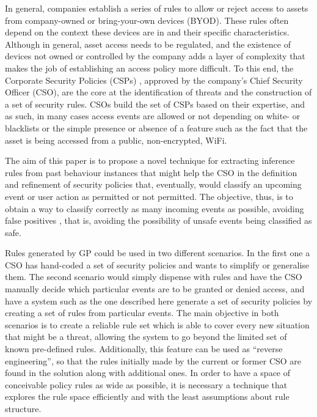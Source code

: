 \documentclass[runningheads]{llncs}
\begin{document}
In general, companies establish a series of rules to allow or reject
access to assets from company-owned or bring-your-own devices (BYOD). These rules often depend on the context these devices are in and their specific
characteristics. Although in general, asset access needs to be
regulated, and the existence of devices not owned or controlled by the company
adds a layer of complexity that makes the job of establishing an
access policy more difficult.
To this end, the Corporate Security Policies (CSPs)
\cite{Kaeo:2003:DNS:1201807}, approved by the company's Chief Security
Officer (CSO), are the core at the identification of threats and the
construction of a set of security rules. CSOs build the
set of CSPs based on their expertise, and as such, in many cases
access events are allowed or not depending on white- or blacklists or
the simple presence or absence of a feature such as the fact that the
asset is being accessed from a public, non-encrypted, WiFi.

The aim of this paper is to propose a novel technique for extracting
inference rules from past behaviour instances 
that might help the CSO in the definition and refinement
of security policies that, eventually, would classify an upcoming
event or user action as permitted or not permitted.
The objective, thus, is to obtain a way to classify correctly as many
incoming events as possible, avoiding false positives
\cite{pietraszek2005data}, that is, avoiding the possibility of unsafe
events being classified as safe.

Rules generated by GP could be used
in two different scenarios. In the first one a CSO has hand-coded a set of security
policies and wants to simplify or generalise them. The second scenario 
would simply dispense with rules and have the CSO manually decide which
particular events are to be granted or denied access, and have a system such
as the one described here generate a set of security policies
by creating a set of rules from particular events. 
The main objective in both scenarios is to create a reliable rule set
which is able to cover every new situation that might be a threat,
allowing the system to go beyond the limited set of known pre-defined
rules. Additionally, this feature can be used as ``reverse
engineering'', so that the rules initially made by the current or
former CSO are found in the solution along with additional ones. In
order to have a space of conceivable policy rules as wide 
as possible, it is necessary a technique that explores the rule space
efficiently and with the least assumptions about rule structure.
\end{document}
